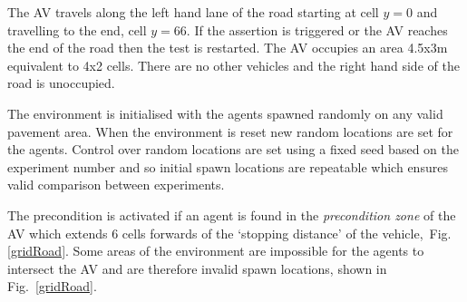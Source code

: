 \documentclass[letterpaper, 10 pt, journal, twoside]{IEEEtran}
\begin{document}
The AV travels along the left hand lane of the road starting at cell $y=0$ and travelling to the end, cell $y=66$. If the assertion is triggered or the AV reaches the end of the road then the test is restarted. The AV occupies an area 4.5x3m equivalent to 4x2 cells. There are no other vehicles and the right hand side of the road is unoccupied.

The environment is initialised with the agents spawned randomly on any valid pavement area. When the environment is reset new random locations are set for the agents. Control over random locations are set using a fixed seed based on the experiment number and so initial spawn locations are repeatable %
which ensures valid comparison between experiments.

The precondition is activated if an agent is found in the \textit{precondition zone} of the AV which extends 6 cells forwards of the `stopping distance' of the vehicle,~Fig.\ref{gridRoad}. %
%
Some areas of the environment are impossible for the agents to intersect the AV and are therefore invalid spawn locations, shown in Fig.~\ref{gridRoad}. %

\end{document}
